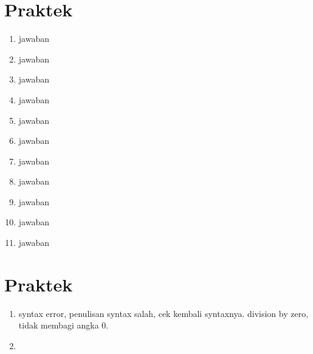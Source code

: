 \section{Praktek}
\begin{enumerate}
\item jawaban


\item jawaban


\item jawaban


\item jawaban


\item jawaban


\item jawaban


\item jawaban


\item jawaban


\item jawaban


\item jawaban


\item jawaban


\end{enumerate}

\section{Praktek}
\begin{enumerate}
\item syntax error, penulisan syntax salah, cek kembali syntaxnya. division by zero, tidak membagi angka 0.
\item 
\end{enumerate}


